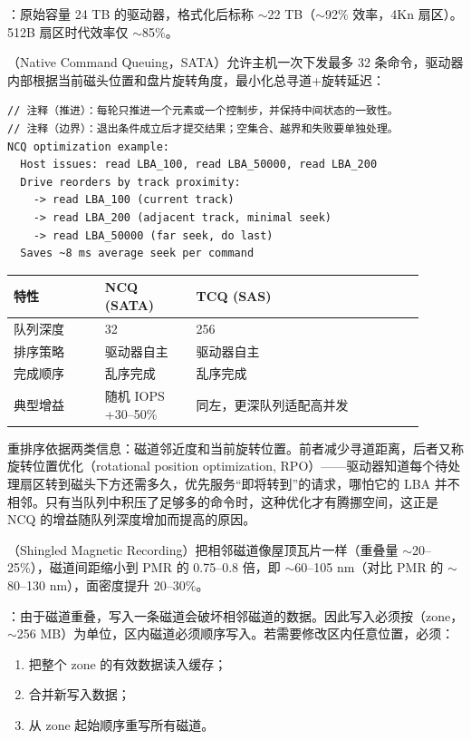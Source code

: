 ：原始容量 24 TB 的驱动器，格式化后标称 $\sim$22 TB（$\sim$92\% 效率，4Kn 扇区）。512B 扇区时代效率仅 $\sim$85\%。


（Native Command Queuing，SATA）允许主机一次下发最多 32 条命令，驱动器内部根据当前磁头位置和盘片旋转角度，最小化总寻道+旋转延迟：

\begin{lstlisting}
// 注释（推进）：每轮只推进一个元素或一个控制步，并保持中间状态的一致性。
// 注释（边界）：退出条件成立后才提交结果；空集合、越界和失败要单独处理。
NCQ optimization example:
  Host issues: read LBA_100, read LBA_50000, read LBA_200
  Drive reorders by track proximity:
    -> read LBA_100 (current track)
    -> read LBA_200 (adjacent track, minimal seek)
    -> read LBA_50000 (far seek, do last)
  Saves ~8 ms average seek per command
\end{lstlisting}

\begin{longtable}{L{0.2\linewidth}L{0.2\linewidth}L{0.5\linewidth}}
\toprule
特性 & NCQ (SATA) & TCQ (SAS) \\
\midrule
队列深度 & 32 & 256 \\\tablerowrule
排序策略 & 驱动器自主 & 驱动器自主 \\\tablerowrule
完成顺序 & 乱序完成 & 乱序完成 \\\tablerowrule
典型增益 & 随机 IOPS +30--50\% & 同左，更深队列适配高并发 \\
\bottomrule
\end{longtable}

重排序依据两类信息：磁道邻近度和当前旋转位置。前者减少寻道距离，后者又称旋转位置优化（rotational position optimization, RPO）——驱动器知道每个待处理扇区转到磁头下方还需多久，优先服务“即将转到”的请求，哪怕它的 LBA 并不相邻。只有当队列中积压了足够多的命令时，这种优化才有腾挪空间，这正是 NCQ 的增益随队列深度增加而提高的原因。


（Shingled Magnetic Recording）把相邻磁道像屋顶瓦片一样（重叠量 $\sim$20--25\%），磁道间距缩小到 PMR 的 0.75--0.8 倍，即 $\sim$60--105 nm（对比 PMR 的 $\sim$80--130 nm），面密度提升 20--30\%。

：由于磁道重叠，写入一条磁道会破坏相邻磁道的数据。因此写入必须按（zone，$\sim$256 MB）为单位，区内磁道必须顺序写入。若需要修改区内任意位置，必须：
\begin{enumerate}
\item 把整个 zone 的有效数据读入缓存；
\item 合并新写入数据；
\item 从 zone 起始顺序重写所有磁道。
\end{enumerate}

